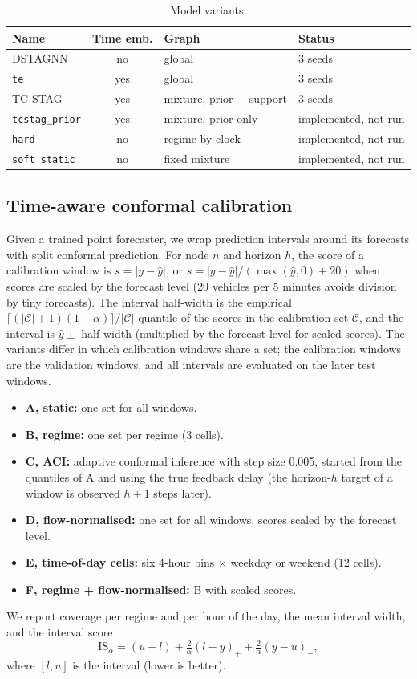 \documentclass[conference]{IEEEtran}
\begin{document}
\begin{table}[t]
\centering\caption{Model variants.}\label{tab:variants}
\footnotesize
\begin{tabular}{@{}p{1.8cm}cp{2.2cm}p{2.1cm}@{}}
\toprule
Name & Time emb. & Graph & Status\\
\midrule
DSTAGNN & no & global & 3 seeds\\
\texttt{te} & yes & global & 3 seeds\\
TC-STAG & yes & mixture, prior + support & 3 seeds\\
\texttt{tcstag\_prior} & yes & mixture, prior only & implemented, not run\\
\texttt{hard} & no & regime by clock & implemented, not run\\
\texttt{soft\_static} & no & fixed mixture & implemented, not run\\
\bottomrule
\end{tabular}
\end{table}

\subsection{Time-aware conformal calibration}\label{sec:conformal}
Given a trained point forecaster, we wrap prediction intervals around its forecasts with split conformal prediction. For node $n$ and horizon $h$, the score of a calibration window is $s=|y-\hat y|$, or $s=|y-\hat y|/(\max(\hat y,0)+20)$ when scores are scaled by the forecast level (20 vehicles per 5 minutes avoids division by tiny forecasts). The interval half-width is the empirical $\lceil(|\mathcal C|+1)(1-\alpha)\rceil/|\mathcal C|$ quantile of the scores in the calibration set $\mathcal C$, and the interval is $\hat y\pm$ half-width (multiplied by the forecast level for scaled scores). The variants differ in which calibration windows share a set; the calibration windows are the validation windows, and all intervals are evaluated on the later test windows.
\begin{itemize}
\item \textbf{A, static:} one set for all windows.
\item \textbf{B, regime:} one set per regime (3 cells).
\item \textbf{C, ACI:} adaptive conformal inference \cite{gibbs2021aci} with step size 0.005, started from the quantiles of A and using the true feedback delay (the horizon-$h$ target of a window is observed $h+1$ steps later).
\item \textbf{D, flow-normalised:} one set for all windows, scores scaled by the forecast level.
\item \textbf{E, time-of-day cells:} six 4-hour bins $\times$ weekday or weekend (12 cells).
\item \textbf{F, regime + flow-normalised:} B with scaled scores.
\end{itemize}
We report coverage per regime and per hour of the day, the mean interval width, and the interval score \cite{gneiting2007}
\begin{equation}
\mathrm{IS}_\alpha=(u-l)+\tfrac{2}{\alpha}(l-y)_++\tfrac{2}{\alpha}(y-u)_+,
\end{equation}
where $[l,u]$ is the interval (lower is better).
\end{document}
